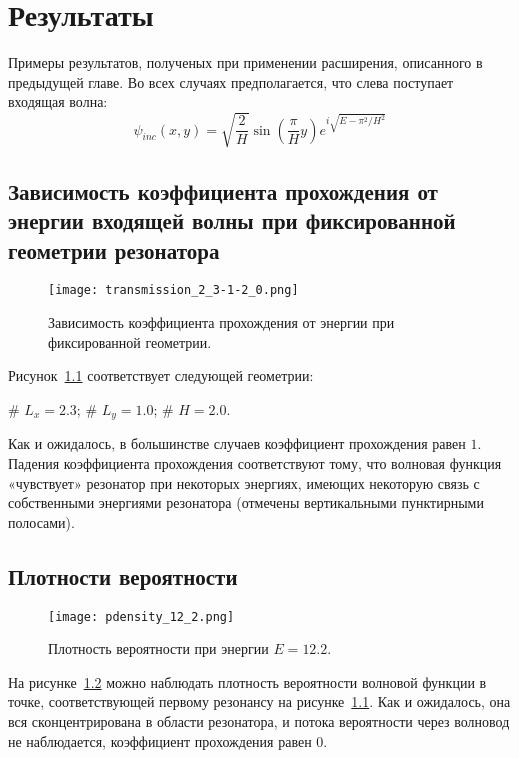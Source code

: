 \chapter{Результаты} 
\label{chapter3}

Примеры результатов, полученых при применении расширения, описанного в предыдущей главе. Во всех случаях предполагается, что слева поступает входящая волна:
\[
\psi_{inc}(x, y) = \sqrt{\frac{2}{H}} \sin(\frac{\pi}{H} y) e^{i \sqrt{E - \pi^2 / H^2}}
\]

\section{Зависимость коэффициента прохождения от энергии входящей волны при фиксированной геометрии резонатора}
\begin{figure}[h!]
\texttt{[image: transmission\_2\_3-1-2\_0.png]}
\caption{Зависимость коэффициента прохождения от энергии при фиксированной геометрии.}
\label{fig:trans_over_energy}
\end{figure}
Рисунок~\ref{fig:trans_over_energy} соответствует следующей геометрии:
\begin{ilist}
# $L_x = 2.3$;
# $L_y = 1.0$;
# $H = 2.0$.
\end{ilist}
Как и ожидалось, в большинстве случаев коэффициент прохождения равен $1$. Падения коэффициента прохождения соответствуют тому, что волновая функция «чувствует» резонатор при некоторых энергиях, имеющих некоторую связь с собственными энергиями резонатора (отмечены вертикальными пунктирными полосами). 

\section{Плотности вероятности}
\begin{figure}[h!]
\texttt{[image: pdensity\_12\_2.png]}
\caption{Плотность вероятности при энергии $E = 12.2$.}
\label{fig:pdensity_12_2}
\end{figure}
На рисунке~\ref{fig:pdensity_12_2} можно наблюдать плотность вероятности волновой функции в точке, соответствующей первому резонансу на рисунке~\ref{fig:trans_over_energy}. Как и ожидалось, она вся сконцентрирована в области резонатора, и потока вероятности через волновод не наблюдается, коэффициент прохождения равен $0$.


